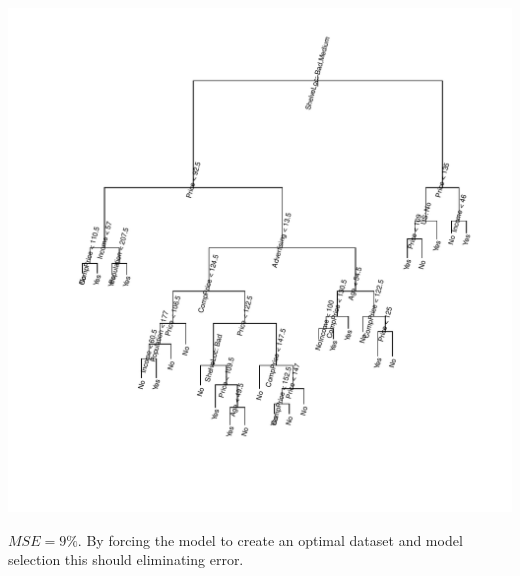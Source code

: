 \documentclass{article}\usepackage[]{graphicx}\usepackage[]{color}
\makeatletter
\def\maxwidth{ %
  \ifdim\Gin@nat@width>\linewidth
    \linewidth
  \else
    \Gin@nat@width
  \fi
}
\newenvironment{knitrout}{}{} %
\makeatother
\begin{document}
\begin{enumerate}[(a)]
\begin{knitrout}
\includegraphics[width=\maxwidth]{figure/unnamed-chunk-3-1} 

\end{knitrout}
$MSE = 9\%$. By forcing the model to create an optimal dataset and model selection this should eliminating error.


\end{enumerate}
\end{document}
